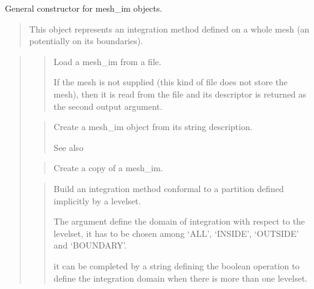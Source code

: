 \documentclass[a4paper,11pt,english]{sphinxmanual}
\begin{document}

General constructor for mesh\_im objects.
\begin{quote}

This object represents an integration method defined on a whole mesh (an
potentially on its boundaries).
\end{quote}

\begin{quote}

\begin{quote}

Load a mesh\_im from a file.

If the mesh  is not supplied (this kind of file does not store the
mesh), then it is read from the file and its descriptor is returned as
the second output argument.
\end{quote}

\begin{quote}

Create a mesh\_im object from its string description.

See also 
\end{quote}

\begin{quote}

Create a copy of a mesh\_im.
\end{quote}

\begin{quote}

Build an integration method conformal to a partition defined
implicitly by a levelset.

The  argument define the domain of integration with respect to
the levelset, it has to be chosen among ‘ALL’, ‘INSIDE’, ‘OUTSIDE’ and
‘BOUNDARY’.

it can be completed by a string defining the boolean operation
to define the integration domain when there is more than one levelset.


\end{quote}
\end{quote}
\end{document}
